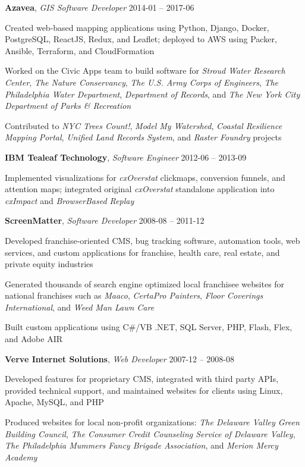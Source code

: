 \documentclass[12pt,a4paper]{article}
\newcommand{\workhead}[3]{\textbf{#1}, \emph{#2} \hfill #3}
\newcommand{\li}{\item[--]}
\begin{document}
\begin{description}[leftmargin=0em]
    \item
        \workhead{Azavea}{GIS Software Developer}{2014-01 -- 2017-06}
        \begin{itemize*}
            \li Created web-based mapping applications using Python, Django, Docker, PostgreSQL, \mbox{ReactJS}, Redux, and Leaflet; deployed to AWS using Packer, Ansible, Terraform, and CloudFormation
            \li Worked on the Civic Apps team to build software for \emph{Stroud Water Research Center}, \emph{The Nature Conservancy}, \emph{The U.S. Army Corps of Engineers}, \emph{The Philadelphia Water Department}, \emph{Department of Records}, and \emph{The New York City Department of Parks \& Recreation}
            \li Contributed to \emph{NYC Trees Count!}, \emph{Model My Watershed}, \emph{Coastal Resilience Mapping Portal}, \emph{Unified Land Records System}, and \emph{Raster Foundry} projects
        \end{itemize*}

    \item
        \workhead{IBM Tealeaf Technology}{Software Engineer}{2012-06 -- 2013-09}
        \begin{itemize*}
            \li Implemented visualizations for \emph{cxOverstat} clickmaps, conversion funnels, and attention maps; integrated original \emph{cxOverstat} standalone application into \emph{cxImpact} and \emph{BrowserBased Replay}
        \end{itemize*}

    \item
        \workhead{ScreenMatter}{Software Developer}{2008-08 -- 2011-12}
        \begin{itemize*}
            \li Developed franchise-oriented CMS, bug tracking software, automation tools, web services, and custom applications for franchise, health care, real estate, and private equity industries
            \li Generated thousands of search engine optimized local franchisee websites for national franchises such as \emph{Maaco}, \emph{\mbox{CertaPro} Painters}, \emph{Floor Coverings International}, and \emph{Weed Man Lawn Care}
            \li Built custom applications using C\#/VB .NET, SQL Server, PHP, Flash, Flex, and Adobe AIR
        \end{itemize*}

    \item
        \workhead{Verve Internet Solutions}{Web Developer}{2007-12 -- 2008-08}
        \begin{itemize*}
            \li Developed features for proprietary CMS, integrated with third party APIs, provided technical support, and maintained websites for clients using Linux, Apache, MySQL, and PHP
            \li Produced websites for local non-profit organizations: \emph{The Delaware Valley Green Building Council}, \emph{The Consumer Credit Counseling Service of Delaware Valley}, \emph{The Philadelphia Mummers Fancy Brigade Association}, and \emph{Merion Mercy Academy}
        \end{itemize*}


\end{description}
\end{document}
